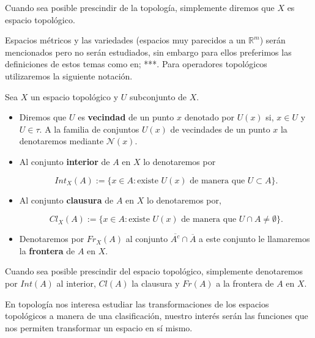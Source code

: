 \begin{cn}
 Cuando sea posible prescindir de la topología, simplemente diremos que $X$ es espacio topológico. 
\end{cn}

Espacios métricos y las variedades (espacios muy parecidos a un $\mathbb{R}^m$) serán mencionados pero no serán estudiados, sin embargo para ellos preferimos las definiciones de estos temas como en; ***. Para operadores topológicos utilizaremos la siguiente notación. 

\begin{df}
Sea $X$ un espacio topológico y $U$ subconjunto de $X$.

\begin{itemize}
	\item Diremos que $U$ es \textbf{vecindad} de un punto $x$ denotado por $U(x)$ si, $x \in U$ y $U \in \tau$. A la familia de conjuntos $U(x)$ de vecindades de un punto $x$ la denotaremos mediante $\mathcal{N}(x)$.
 
 \item Al conjunto \textbf{interior} de $A$ en $X$ lo denotaremos por 
 
  $$Int_X(A):=\{x \in A: \text{existe } U(x) \text{ de manera que } U \subset A\}.$$
  

 \item  Al conjunto  \textbf{clausura} de $A$ en $X$ lo denotaremos por, 
  
$$Cl_X(A):=\{x \in A: \text{existe } U(x) \text{ de manera que } U \cap A \neq \emptyset\}.$$
 
 \item Denotaremos por  $Fr_X(A)$ al conjunto $\overline{A^c} \cap \overline{A} $ a este conjunto le llamaremos la 
  \textbf{frontera} de $A$ en $X$.
 \end{itemize}
\end{df}

\begin{cn}
 Cuando sea posible prescindir del espacio topológico, simplemente denotaremos por $Int(A)$ al interior, $Cl(A)$ la clausura y  $Fr(A)$ a la frontera de $A$ en $X$.
\end{cn}

En topología nos interesa estudiar las transformaciones de los  espacios topológicos a manera de una clasificación, nuestro interés serán las funciones que nos permiten transformar un espacio en sí mismo. 

